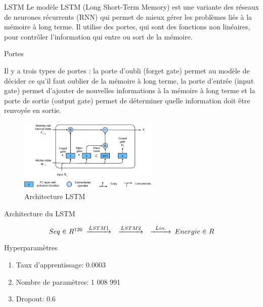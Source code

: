 \documentclass{beamer}
\begin{document}
\begin{frame}{LSTM}
Le modèle LSTM (Long Short-Term Memory) est une variante des réseaux de neurones récurrents (RNN) qui permet de mieux gérer les problèmes liés à la mémoire à long terme. Il utilise des portes, qui sont des fonctions non linéaires, pour contrôler l'information qui entre ou sort de la mémoire.
\end{frame}


\begin{frame}{Portes}

Il y a trois types de portes : la porte d'oubli (forget gate) permet au modèle de décider ce qu'il faut oublier de la mémoire à long terme, la porte d'entrée (input gate) permet d'ajouter de nouvelles informations à la mémoire à long terme et la porte de sortie (output gate) permet de déterminer quelle information doit être renvoyée en sortie.
\begin{figure} \label{fig:architecture_lstm}
    \caption{Architecture LSTM} \center
    \includegraphics[width=0.6\textwidth]{images/lstm-schema.png}
\end{figure}

\end{frame}

\begin{frame}{Architecture du LSTM}

\begin{equation*}
    \begin{CD}
        @. Seq \in R^{120}
        @>LSTM1>> 
        @>LSTM2>> 
        @>Lin.>> 
        Energie \in R
    \end{CD}
\end{equation*}

\begin{block}{Hyperparamètres}
\begin{enumerate}
    \item Taux d'apprentissage: 0.0003
    \item Nombre de paramètres: 1 008 991 
    \item Dropout: 0.6
\end{enumerate}
\end{block}

\end{frame}
\end{document}
